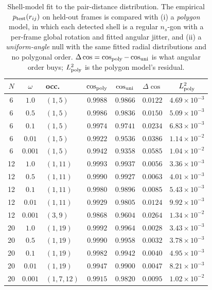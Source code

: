 \begin{table}[H]
\centering
\caption[Shell-model fit to the pair-distance distribution]{Shell-model fit to the pair-distance distribution. The empirical
$p_{\rm test}(r_{ij})$ on held-out frames is compared with (i) a \emph{polygon} model, in
which each detected shell is a regular $n_s$-gon with a per-frame global rotation and fitted
angular jitter, and (ii) a \emph{uniform-angle} null with the same fitted radial
distributions and no polygonal order. $\Delta\cos=\cos_{\rm poly}-\cos_{\rm uni}$ is what
angular order buys; $L^2_{\rm poly}$ is the polygon model's residual.}
\label{tab:shell-model-fit}
\small
\setlength{\tabcolsep}{6pt}
\begin{tabular}{ccl cccc}
\toprule
$N$ & $\omega$ & occ. & $\cos_{\rm poly}$ & $\cos_{\rm uni}$ & $\Delta\cos$ & $L^2_{\rm poly}$ \\
\midrule
 6 & $1.0$   & $(1,5)$    & $0.9988$ & $0.9866$ & $0.0122$ & $4.69\times10^{-3}$ \\
 6 & $0.5$   & $(1,5)$    & $0.9986$ & $0.9836$ & $0.0150$ & $5.09\times10^{-3}$ \\
 6 & $0.1$   & $(1,5)$    & $0.9974$ & $0.9741$ & $0.0234$ & $6.83\times10^{-3}$ \\
 6 & $0.01$  & $(1,5)$    & $0.9922$ & $0.9536$ & $0.0386$ & $1.14\times10^{-2}$ \\
 6 & $0.001$ & $(1,5)$    & $0.9942$ & $0.9358$ & $\mathbf{0.0585}$ & $1.04\times10^{-2}$ \\
\midrule
12 & $1.0$   & $(1,11)$   & $0.9993$ & $0.9937$ & $0.0056$ & $3.36\times10^{-3}$ \\
12 & $0.5$   & $(1,11)$   & $0.9990$ & $0.9927$ & $0.0063$ & $4.01\times10^{-3}$ \\
12 & $0.1$   & $(1,11)$   & $0.9980$ & $0.9896$ & $0.0085$ & $5.43\times10^{-3}$ \\
12 & $0.01$  & $(1,11)$   & $0.9929$ & $0.9805$ & $0.0124$ & $9.92\times10^{-3}$ \\
12 & $0.001$ & $(3,9)$    & $0.9868$ & $0.9604$ & $\mathbf{0.0264}$ & $1.34\times10^{-2}$ \\
\midrule
20 & $1.0$   & $(1,19)$   & $0.9992$ & $0.9964$ & $0.0028$ & $3.43\times10^{-3}$ \\
20 & $0.5$   & $(1,19)$   & $0.9990$ & $0.9958$ & $0.0032$ & $3.78\times10^{-3}$ \\
20 & $0.1$   & $(1,19)$   & $0.9982$ & $0.9942$ & $0.0040$ & $4.95\times10^{-3}$ \\
20 & $0.01$  & $(1,19)$   & $0.9947$ & $0.9900$ & $0.0047$ & $8.21\times10^{-3}$ \\
20 & $0.001$ & $(1,7,12)$ & $0.9915$ & $0.9820$ & $\mathbf{0.0095}$ & $1.02\times10^{-2}$ \\
\bottomrule
\end{tabular}
\end{table}

